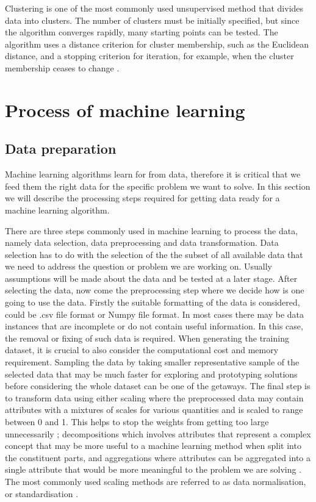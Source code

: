 Clustering is one of the most commonly used unsupervised method that divides data into clusters. The number of clusters must be initially specified, but since the algorithm converges rapidly, many starting points can be tested. The algorithm uses a distance
criterion for cluster membership, such as the Euclidean distance, and a stopping criterion for iteration, for example, when the cluster membership ceases to change \citep{ball2010data}.

\section{Process of machine learning}
\label{Process}
\subsection{Data preparation}
Machine learning algorithms learn for from data, therefore it is critical that we feed them the right data for the specific problem we want to solve. In this section we will describe the processing steps required for getting data ready for a machine learning algorithm.

There are three steps commonly used in machine learning to process the data, namely data selection, data preprocessing  and data transformation. Data selection has to do with the selection of the the subset of all available data that we need to address the question or problem we are working on. Usually assumptions will be made  about the data and be tested at a later stage. After selecting the data, now come the preprocessing step where we decide how is one going to use the data. Firstly the suitable formatting of the data is considered, could be .csv file format or Numpy file format. In most cases there may be data instances that are incomplete or do not contain useful information. In this case, the removal or fixing of such data is required. When generating the training dataset, it is crucial to also consider the computational cost and memory requirement. Sampling the data by taking smaller representative sample of the selected data that may be much faster for exploring and prototyping solutions before considering the whole dataset can be one of the getaways. The final step is to transform data using either scaling where the preprocessed data may contain attributes with a mixtures of scales for various quantities and is scaled to range between 0 and 1. This helps to stop the weights from getting too large unnecessarily \citep{marsland2015machine}; decompositions which involves attributes that represent a complex concept that may be more useful to a machine learning method when split into the constituent parts, and  aggregations where attributes can be aggregated into a single attribute that would be more meaningful to the problem we are solving \citep{brownlee2013prepare}. The most commonly used scaling methods are referred to as data normalisation, or standardisation \citep{marsland2015machine}.
    
